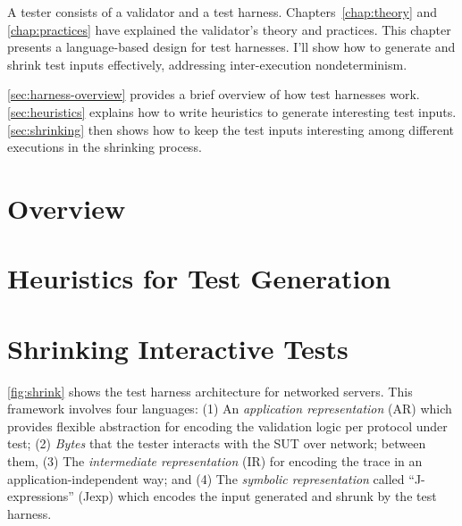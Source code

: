 A tester consists of a validator and a test harness.  Chapters~\ref{chap:theory}
and \ref{chap:practices} have explained the validator's theory and practices.
This chapter presents a language-based design for test harnesses.  I'll show how
to generate and shrink test inputs effectively, addressing inter-execution
nondeterminism.

\autoref{sec:harness-overview} provides a brief overview of how test harnesses
work.  \autoref{sec:heuristics} explains how to write heuristics to generate
interesting test inputs.  \autoref{sec:shrinking} then shows how to keep the
test inputs interesting among different executions in the shrinking process.

\section{Overview}
\label{sec:harness-overview}


\section{Heuristics for Test Generation}
\label{sec:heuristics}



\section{Shrinking Interactive Tests}
\label{sec:shrinking}


\autoref{fig:shrink} shows the test harness architecture for networked
servers.  This framework involves four languages: (1) An {\em
  application representation} (AR) which provides flexible abstraction
for encoding the validation logic per protocol under test; (2) {\em
  Bytes} that the tester interacts with the SUT over network; between
them, (3) The {\em intermediate representation} (IR) for encoding the
trace in an application-independent way; and (4) The {\em symbolic
  representation} called ``J-expressions'' (Jexp) which encodes the
input generated and shrunk by the test harness.

